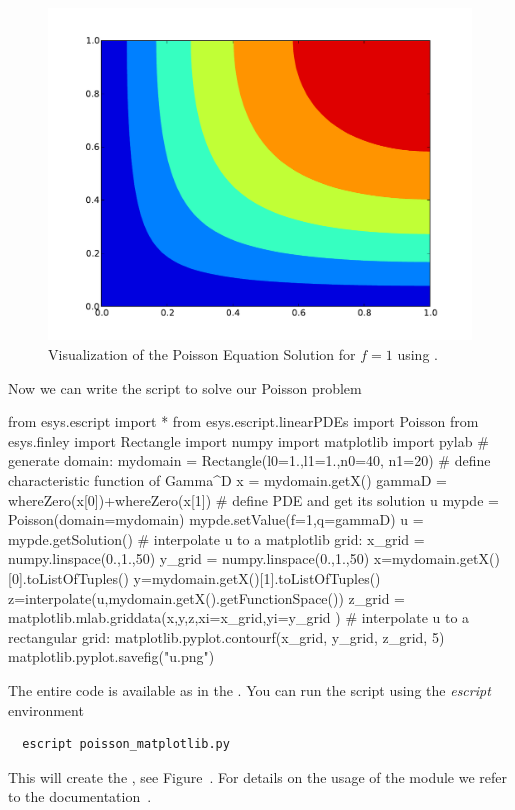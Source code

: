 \begin{figure}
\centerline{\includegraphics[width=\figwidth]{figures/FirstStepResultMATPLOTLIB}}
\caption{Visualization of the Poisson Equation Solution for $f=1$ using \MATPLOTLIB.}
\label{fig:FirstSteps.3b}
\end{figure}

Now we can write the script to solve our Poisson problem
\begin{python}
from esys.escript import *
from esys.escript.linearPDEs import Poisson
from esys.finley import Rectangle
import numpy
import matplotlib
import pylab
# generate domain:
mydomain = Rectangle(l0=1.,l1=1.,n0=40, n1=20)
# define characteristic function of Gamma^D
x = mydomain.getX()
gammaD = whereZero(x[0])+whereZero(x[1])
# define PDE and get its solution u
mypde = Poisson(domain=mydomain)
mypde.setValue(f=1,q=gammaD)
u = mypde.getSolution()
# interpolate u to a matplotlib grid:
x_grid = numpy.linspace(0.,1.,50)
y_grid = numpy.linspace(0.,1.,50)
x=mydomain.getX()[0].toListOfTuples()
y=mydomain.getX()[1].toListOfTuples()
z=interpolate(u,mydomain.getX().getFunctionSpace())
z_grid = matplotlib.mlab.griddata(x,y,z,xi=x_grid,yi=y_grid )
# interpolate u to a rectangular grid:
matplotlib.pyplot.contourf(x_grid, y_grid, z_grid, 5)
matplotlib.pyplot.savefig("u.png")
\end{python}
The entire code is available as  in the \ExampleDirectory.
You can run the script using the {\it escript} environment
\begin{verbatim}
  escript poisson_matplotlib.py
\end{verbatim}
This will create the , see Figure~.
For details on the usage of the \MATPLOTLIB module we refer to the documentation~\cite{matplotlib}.

